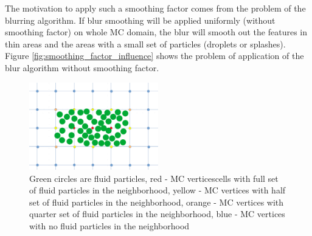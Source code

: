 The motivation to apply such a smoothing factor comes from the problem of the blurring algorithm. If  blur smoothing will be applied uniformly (without smoothing factor) on whole MC domain, the blur will smooth out the features in thin areas and the areas with a small set of particles (droplets or splashes). Figure \ref{fig:smoothing_factor_influence} shows the problem of application of the blur algorithm without smoothing factor.
\begin{figure}[H]
	\begin{center}
		\includegraphics[width=0.5\textwidth]{figures/SmoothingFactorPictureExplenation.png}		
		\caption{Green circles are fluid particles, red - MC verticescells with full set of fluid particles in the neighborhood, yellow -  MC vertices with half set of fluid particles in the neighborhood, orange - MC vertices with quarter set of fluid particles in the neighborhood, blue - MC vertices with no fluid particles in the neighborhood}
		\label{fig:sf_example}
	\end{center}
\end{figure}

